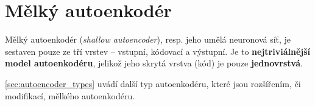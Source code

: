 \section{Mělký autoenkodér}
\label{sec:shallow_autoncoder}
Mělký autoenkodér (\emph{shallow autoencoder}), resp. jeho umělá neuronová síť, je sestaven pouze ze tří vrstev – vstupní, kódovací a výstupní.
Je to \textbf{nejtriviálnější model autoenkodéru}, jelikož jeho skrytá vrstva (kód) je pouze \textbf{jednovrstvá}. \cite{Charte2018}

\autoref{sec:autoencoder_types} uvádí další typ autoenkodéru, které jsou rozšířením, či modifikací, mělkého autoenkodéru.

